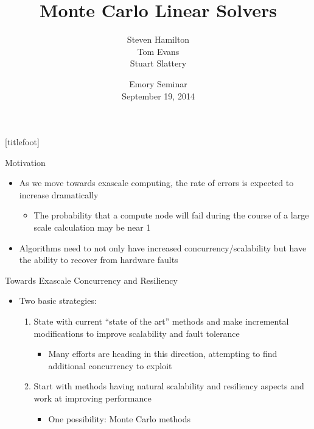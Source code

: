 \documentclass{beamer}
\title[Monte Carlo Linear Solvers]{Monte Carlo Linear Solvers}
\author[Hamilton, Evans, Slattery]{Steven Hamilton \\ Tom Evans \\ Stuart Slattery}
\date[Emory Seminar]{Emory Seminar \\ September 19, 2014}
\institute[ORNL]{Oak Ridge National Lab}
\begin{document}

{
[titlefoot]
\begin{frame}
\titlepage
\end{frame}
}

\begin{frame}{Motivation}
  \vfill
\begin{itemize}
  \item As we move towards exascale computing, the rate of errors is expected
  to increase dramatically
  \vfil
  \begin{itemize}
    \item The probability that a compute node will fail during the course
      of a large scale calculation may be near 1
  \end{itemize}
  \vfill
  \item Algorithms need to not only have increased concurrency/scalability
    but have the ability to recover from hardware faults
\end{itemize}
  \vfill
\end{frame}
\begin{frame}{Towards Exascale Concurrency and Resiliency}
  \begin{itemize}
    \item Two basic strategies:
      \vfill
      \begin{enumerate}
        \item State with current ``state of the art'' methods and make
          incremental modifications to improve scalability and fault
          tolerance
          \begin{itemize}
            \item Many efforts are heading in this direction, attempting
              to find additional concurrency to exploit
          \end{itemize}
        \vfill
        \item Start with methods having natural scalability and resiliency
          aspects and work at improving performance
          \begin{itemize}
            \item One possibility: Monte Carlo methods
          \end{itemize}
      \end{enumerate}
  \end{itemize}
  \vfill
\end{frame}
\end{document}
